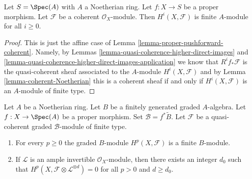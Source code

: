 \begin{lemma}
\label{lemma-proper-over-affine-cohomology-finite}
Let $S = \Spec(A)$ with $A$ a Noetherian ring.
Let $f : X \to S$ be a proper morphism.
Let $\mathcal{F}$ be a coherent $\mathcal{O}_X$-module.
Then $H^i(X, \mathcal{F})$ is finite $A$-module for all $i \geq 0$.
\end{lemma}

\begin{proof}
This is just the affine case of Lemma \ref{lemma-proper-pushforward-coherent}.
Namely, by Lemmas \ref{lemma-quasi-coherence-higher-direct-images} and
\ref{lemma-quasi-coherence-higher-direct-images-application} we know that
$R^if_*\mathcal{F}$ is the quasi-coherent sheaf associated
to the $A$-module $H^i(X, \mathcal{F})$
and by Lemma \ref{lemma-coherent-Noetherian} this is
a coherent sheaf if and only if $H^i(X, \mathcal{F})$
is an $A$-module of finite type.
\end{proof}

\begin{lemma}
\label{lemma-graded-finiteness}
Let $A$ be a Noetherian ring.
Let $B$ be a finitely generated graded $A$-algebra.
Let $f : X \to \Spec(A)$ be a proper morphism.
Set $\mathcal{B} = f^*\widetilde B$.
Let $\mathcal{F}$ be a quasi-coherent
graded $\mathcal{B}$-module of finite type.
\begin{enumerate}
\item For every $p \geq 0$ the graded $B$-module $H^p(X, \mathcal{F})$
is a finite $B$-module.
\item If $\mathcal{L}$ is an ample invertible $\mathcal{O}_X$-module,
then there exists an integer $d_0$ such that
$H^p(X, \mathcal{F} \otimes \mathcal{L}^{\otimes d}) = 0$
for all $p > 0$ and $d \geq d_0$.
\end{enumerate}
\end{lemma}

